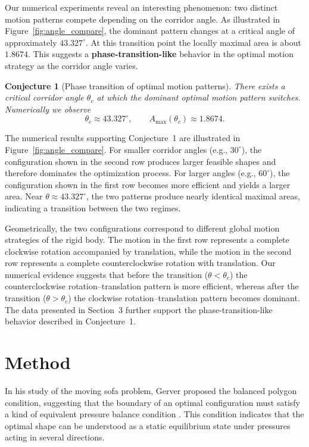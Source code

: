 \documentclass[12pt,a4paper]{article}
\newtheorem{conjecture}{Conjecture}
\theoremstyle{remark} %
\begin{document}
Our numerical experiments reveal an interesting phenomenon: two distinct motion patterns compete depending on the corridor angle. As illustrated in Figure~\ref{fig:angle_compare}, the dominant pattern changes at a critical angle of approximately $43.327^\circ$. At this transition point the locally maximal area is about $1.8674$. This suggests a \textbf { phase-transition-like } behavior in the optimal motion strategy as the corridor angle varies.

\begin{conjecture}[Phase transition of optimal motion patterns]
There exists a critical corridor angle $\theta_c$ at which the dominant optimal motion pattern switches. Numerically we observe
\[
\theta_c \approx 43.327^\circ ,
\qquad
A_{\max}(\theta_c) \approx 1.8674 .
\]
\end{conjecture}

The numerical results supporting Conjecture~1 are illustrated in Figure~\ref{fig:angle_compare}. 
For smaller corridor angles (e.g., $30^\circ$), the configuration shown in the second row produces larger feasible shapes and therefore dominates the optimization process. 
For larger angles (e.g., $60^\circ$), the configuration shown in the first row becomes more efficient and yields a larger area. 
Near $\theta \approx 43.327^\circ$, the two patterns produce nearly identical maximal areas, indicating a transition between the two regimes.

Geometrically, the two configurations correspond to different global motion strategies of the rigid body. 
The motion in the first row represents a complete clockwise rotation accompanied by translation, while the motion in the second row represents a complete counterclockwise rotation with translation. 
Our numerical evidence suggests that before the transition ($\theta < \theta_c$) the counterclockwise rotation--translation pattern is more efficient, whereas after the transition ($\theta > \theta_c$) the clockwise rotation--translation pattern becomes dominant. 
The data presented in Section~3 further support the phase-transition-like behavior described in Conjecture~1.

\section{Method}

In his study of the moving sofa problem, Gerver proposed the balanced polygon condition, suggesting that the boundary of an optimal configuration must satisfy a kind of equivalent pressure balance condition \cite{Gerver1992}. This condition indicates that the optimal shape can be understood as a static equilibrium state under pressures acting in several directions.
\end{document}
